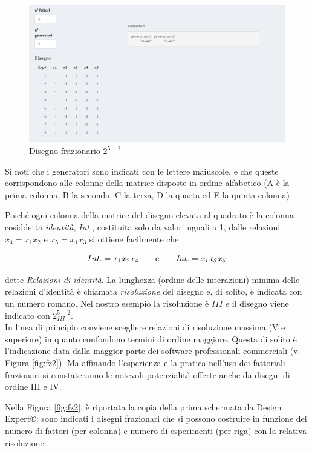 \documentclass[
  11pt,
]{book}
\begin{document}
\begin{figure}[ht]

{\centering \includegraphics[width=1\linewidth]{Immagini/Fraz/01_fraz} 

}

\caption{Disegno frazionario $2^{5-2}$}\label{fig:fz1}
\end{figure}

Si noti che i generatori sono indicati con le lettere maiuscole, e che queste corrispondono alle colonne della matrice disposte in ordine alfabetico (A è la prima colonna, B la seconda, C la terza, D la quarta ed E la quinta colonna)

Poiché ogni colonna della matrice del disegno elevata al quadrato è la colonna cosiddetta \emph{identità}, \emph{Int.}, costituita solo da valori uguali a 1, dalle relazioni \(x_4=x_1x_2\) e \(x_5=x_1x_3\) si ottiene facilmente che

\[
Int.=x_1x_2x_4 \qquad  \rm{e} \qquad \it{Int.} = x_1x_3x_5 
\]

dette \emph{Relazioni di identità}. La lunghezza (ordine delle interazioni) minima delle relazioni d'identità è chiamata \emph{risoluzione} del disegno e, di solito, è indicata con un numero romano. Nel nostro esempio la risoluzione è \(III\) e il disegno viene indicato con \(2^{5-2}_{III}\).\\
In linea di principio conviene scegliere relazioni di risoluzione massima (V e superiore) in quanto confondono termini di ordine maggiore. Questa di solito è l'indicazione data dalla maggior parte dei software professionali commerciali (v. Figura \ref{fig:fz2}). Ma affinando l'esperienza e la pratica nell'uso dei fattoriali frazionari si constateranno le notevoli potenzialità offerte anche da disegni di ordine III e IV.

Nella Figura \ref{fig:fz2}, è riportata la copia della prima schermata da Design Expert®: sono indicati i disegni frazionari che si possono costruire in funzione del numero di fattori (per colonna) e numero di esperimenti (per riga) con la relativa risoluzione.
\end{document}
